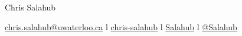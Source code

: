 \documentclass[a4paper,11pt]{article}
\newcommand*{\img}[1]{%
	\raisebox{0\baselineskip}{%
		\texttt{[image: \#1]}%
	}%
}
\begin{document}
	\setlength{\tabcolsep}{0in}
	\setlength{\baselineskip}{2pt}
	\setlength{\lineskip}{2pt}
	\setlength{\parskip}{2pt}
	\setlength{\topskip}{2pt}

\begin{center}
	{\fontsize{35pt}{0pt} \selectfont Chris Salahub} \\
	\vspace{0.3cm}
	
	\href{mailto:chris.salahub@uwaterloo.ca}{\img{emailIcon} chris.salahub@uwaterloo.ca} \hspace{0.1cm} {\Large l} \hspace{0.1cm} 
	\href{https://www.linkedin.com/in/chris-salahub/}{\img{linkedinIcon} chris-salahub}  \hspace{0.1cm} {\Large l} \hspace{0.1cm}
	\href{https://github.com/Salahub}{\img{githubIcon} Salahub}  \hspace{0.1cm} {\Large l} \hspace{0.1cm}
	\href{https://medium.com/@Salahub}{\img{mediumIcon2} @Salahub} 
\end{center}



\vspace{0cm}
\end{document}
